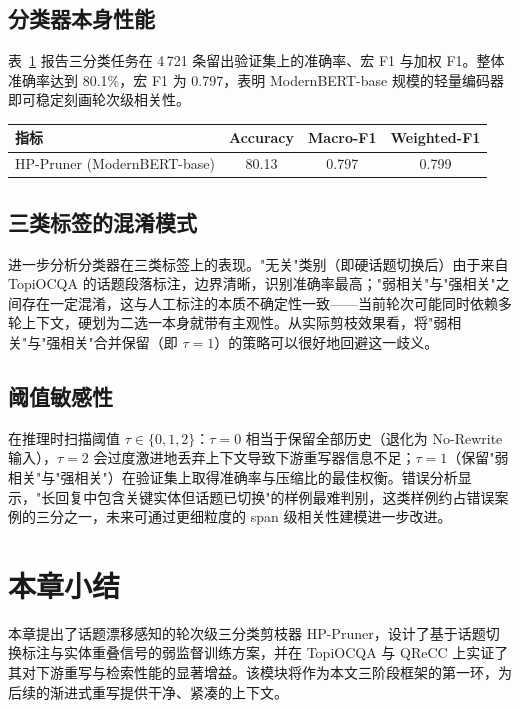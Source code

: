 \subsection{分类器本身性能}

表~\ref{tab:hp_classifier} 报告三分类任务在 4\,721 条留出验证集上的准确率、宏 F1 与加权 F1。整体准确率达到 80.1\%，宏 F1 为 0.797，表明 ModernBERT-base 规模的轻量编码器即可稳定刻画轮次级相关性。

\begin{table}[h]
\centering
{}
\label{tab:hp_classifier}
\begin{tabular}{lccc}
\toprule
指标 & Accuracy & Macro-F1 & Weighted-F1 \\
\midrule
HP-Pruner (ModernBERT-base) & 80.13 & 0.797 & 0.799 \\
\bottomrule
\end{tabular}
\end{table}

\subsection{三类标签的混淆模式}

进一步分析分类器在三类标签上的表现。"无关"类别（即硬话题切换后）由于来自 TopiOCQA 的话题段落标注，边界清晰，识别准确率最高；"弱相关"与"强相关"之间存在一定混淆，这与人工标注的本质不确定性一致——当前轮次可能同时依赖多轮上下文，硬划为二选一本身就带有主观性。从实际剪枝效果看，将"弱相关"与"强相关"合并保留（即 $\tau=1$）的策略可以很好地回避这一歧义。

\subsection{阈值敏感性}

在推理时扫描阈值 $\tau\in\{0,1,2\}$：$\tau=0$ 相当于保留全部历史（退化为 No-Rewrite 输入），$\tau=2$ 会过度激进地丢弃上下文导致下游重写器信息不足；$\tau=1$（保留"弱相关"与"强相关"）在验证集上取得准确率与压缩比的最佳权衡。错误分析显示，"长回复中包含关键实体但话题已切换"的样例最难判别，这类样例约占错误案例的三分之一，未来可通过更细粒度的 span 级相关性建模进一步改进。

\section{本章小结}

本章提出了话题漂移感知的轮次级三分类剪枝器 HP-Pruner，设计了基于话题切换标注与实体重叠信号的弱监督训练方案，并在 TopiOCQA 与 QReCC 上实证了其对下游重写与检索性能的显著增益。该模块将作为本文三阶段框架的第一环，为后续的渐进式重写提供干净、紧凑的上下文。
